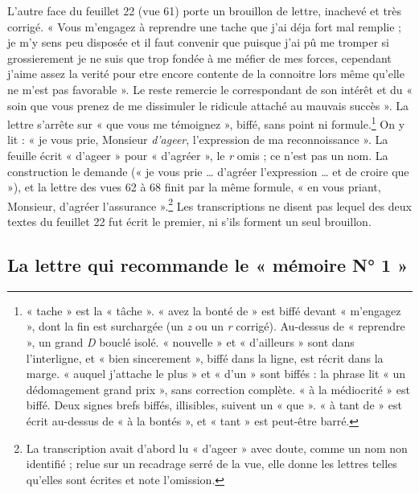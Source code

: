 \documentclass[11pt,a4paper]{article}
\begin{document}
L'autre face du feuillet 22 (vue 61) porte un brouillon de lettre, inachevé
et très corrigé. « Vous m'engagez à reprendre une tache que j'ai déja fort mal
remplie ; je m'y sens peu disposée et il faut convenir que puisque j'ai pû me
tromper si grossierement je ne suis que trop fondée à me méfier de mes forces,
cependant j'aime assez la verité pour etre encore contente de la connoitre lors
même qu'elle ne m'est pas favorable ». Le reste remercie le correspondant de
son intérêt et du « soin que vous prenez de me dissimuler le ridicule attaché
au mauvais succès ». La lettre s'arrête sur « que vous me témoignez », biffé,
sans point ni formule.\footnote{« tache » est la « tâche ». « avez la bonté
de » est biffé devant « m'engagez », dont la fin est surchargée (un \emph{z} ou
un \emph{r} corrigé). Au-dessus de « reprendre », un grand \emph{D} bouclé isolé.
« nouvelle » et « d'ailleurs » sont dans l'interligne, et « bien
sincerement », biffé dans la ligne, est récrit dans la marge. « auquel
j'attache le plus » et « d'un » sont biffés : la phrase lit « un dédomagement
grand prix », sans correction complète. « à la médiocrité » est biffé. Deux
signes brefs biffés, illisibles, suivent un « que ». « à tant de » est écrit
au-dessus de « à la bontés », et « tant » est peut-être barré.} On y lit :
« je vous prie, Monsieur \emph{d'ageer}, l'expression de ma
reconnoissance ». La feuille écrit « d'ageer » pour « d'agréer », le \emph{r} omis ; ce n'est pas un nom. La construction le demande (« je vous prie … d'agréer l'expression … et de croire que »), et la lettre des vues 62 à 68 finit par la même formule, « en vous priant, Monsieur, d'agréer l'assurance ».\footnote{La transcription avait d'abord lu « d'ageer » avec doute, comme un nom non identifié ; relue sur un recadrage serré de la vue, elle donne les lettres telles qu'elles sont écrites et note l'omission.} Les transcriptions ne disent pas lequel des deux textes du feuillet
22 fut écrit le premier, ni s'ils forment un seul brouillon.

\subsection*{La lettre qui recommande le « mémoire N° 1 »}
\end{document}
